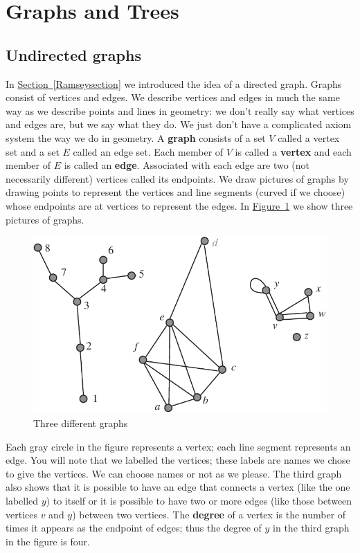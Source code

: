 \documentclass[10pt,]{book}
\newcommand{\terminology}[1]{\textbf{#1}}
\theoremstyle{plain}
\theoremstyle{definition}
\theoremstyle{definition}
\numberwithin{equation}{chapter}
\begin{document}
\section[{Graphs and Trees}]{Graphs and Trees}\label{sec_induction-graphstrees}
\typeout{************************************************}
\typeout{************************************************}
\subsection[{Undirected graphs}]{Undirected graphs}\label{graphsection}
In \hyperref[Ramseysection]{Section~\ref{Ramseysection}} we introduced the idea of a directed graph. Graphs consist of vertices and edges. We describe vertices and edges in much the same way as we describe points and lines in geometry: we don't really say what vertices and edges are, but we say what they do. We just don't have a complicated axiom system the way we do in geometry. A \terminology{graph} consists of a set \(V\) called a vertex set and a set \(E\) called an edge set. Each member of \(V\) is called a \terminology{vertex} and each member of \(E\) is called an \terminology{edge}. Associated with each edge are two (not necessarily different) vertices called its endpoints. We draw pictures of graphs by drawing points to represent the vertices and line segments (curved if we choose) whose endpoints are at vertices to represent the edges. In \hyperref[Threegraphs]{Figure~\ref{Threegraphs}} we show three pictures of graphs.%
\begin{figure}
\centering
\includegraphics[width=0.95\linewidth]{images/threegraphs}
\caption{Three different graphs\label{Threegraphs}}
\end{figure}
Each gray circle in the figure represents a vertex; each line segment represents an edge. You will note that we labelled the vertices; these labels are names we chose to give the vertices. We can choose names or not as we please. The third graph also shows that it is possible to have an edge that connects a vertex (like the one labelled \(y\)) to itself or it is possible to have two or more edges (like those between vertices \(v\) and \(y\)) between two vertices. The \terminology{degree} of a vertex is the number of times it appears as the endpoint of edges; thus the degree of \(y\) in the third graph in the figure is four.%
\end{document}
